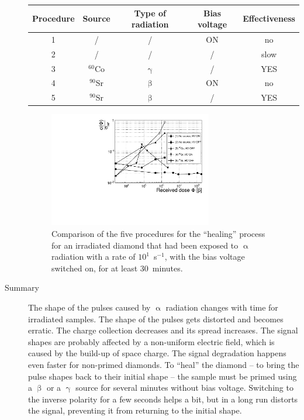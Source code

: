 \begin{description}
\begin{footnotesize}
\begin{center}
\begin{tabular}{   c  c  c  c c }
\hline
Procedure & Source & Type of radiation & Bias voltage & Effectiveness \\
\hline
1 & /                   & /                 & ON    & no \\
2 & /                   & /                 & /        & slow \\
3 & $^{60}$Co   & $\upgamma$ &/         & YES \\
4 & $^{90}$Sr    & $\upbeta$      & ON    & no \\
5 & $^{90}$Sr    & $\upbeta$      & /         & YES \\
\hline
\end{tabular}
\label{tab:healing}
\end{center}
\end{footnotesize}

\begin{figure}[!t]
\begin{center}
\includegraphics[width=0.7\textwidth]{03_measurement_results/scripts/plots/plotLifetime/formCorrelation}
\caption{Comparison of the five procedures for the ``healing'' process for an irradiated diamond that had been exposed to $\upalpha$ radiation with a rate of $10^1$~s$^{-1}$, with the bias voltage switched on, for at least 30~minutes.}
\label{fig:formCorr}
\end{center}
\end{figure}


\item[Summary] The shape of the pulses caused by $\upalpha$ radiation changes with time for irradiated samples. The shape of the pulses gets distorted and becomes erratic. The charge collection decreases and its spread increases. The signal shapes are probably affected by a non-uniform electric field, which is caused by the build-up of space charge. The signal degradation happens even faster for non-primed diamonds. To ``heal'' the diamond -- to bring the pulse shapes back to their initial shape -- the sample must be primed using a $\upbeta$ or a $\upgamma$ source for several minutes without bias voltage. Switching to the inverse polarity for a few seconds helps a bit, but in a long run distorts the signal, preventing it from returning to the initial shape.
\end{description}
